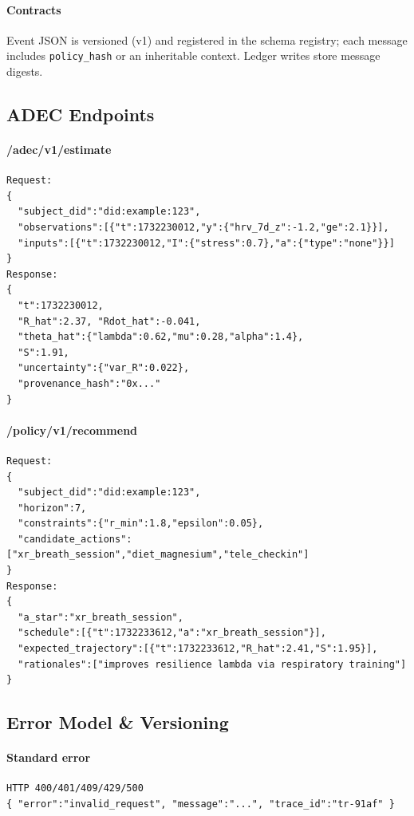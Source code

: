 \documentclass[11pt]{article}
\theoremstyle{plain}
\begin{document}
\paragraph{Contracts}
Event JSON is versioned (v1) and registered in the schema registry; each message includes \texttt{policy\_hash} or an inheritable context. Ledger writes store message digests.

\subsection{ADEC Endpoints}
\paragraph{/adec/v1/estimate}
\begin{verbatim}
Request:
{
  "subject_did":"did:example:123",
  "observations":[{"t":1732230012,"y":{"hrv_7d_z":-1.2,"ge":2.1}}],
  "inputs":[{"t":1732230012,"I":{"stress":0.7},"a":{"type":"none"}}]
}
Response:
{
  "t":1732230012,
  "R_hat":2.37, "Rdot_hat":-0.041,
  "theta_hat":{"lambda":0.62,"mu":0.28,"alpha":1.4},
  "S":1.91,
  "uncertainty":{"var_R":0.022},
  "provenance_hash":"0x..."
}
\end{verbatim}

\paragraph{/policy/v1/recommend}
\begin{verbatim}
Request:
{
  "subject_did":"did:example:123",
  "horizon":7,
  "constraints":{"r_min":1.8,"epsilon":0.05},
  "candidate_actions":["xr_breath_session","diet_magnesium","tele_checkin"]
}
Response:
{
  "a_star":"xr_breath_session",
  "schedule":[{"t":1732233612,"a":"xr_breath_session"}],
  "expected_trajectory":[{"t":1732233612,"R_hat":2.41,"S":1.95}],
  "rationales":["improves resilience lambda via respiratory training"]
}
\end{verbatim}

\subsection{Error Model \& Versioning}
\paragraph{Standard error}
\begin{verbatim}
HTTP 400/401/409/429/500
{ "error":"invalid_request", "message":"...", "trace_id":"tr-91af" }
\end{verbatim}
\end{document}
